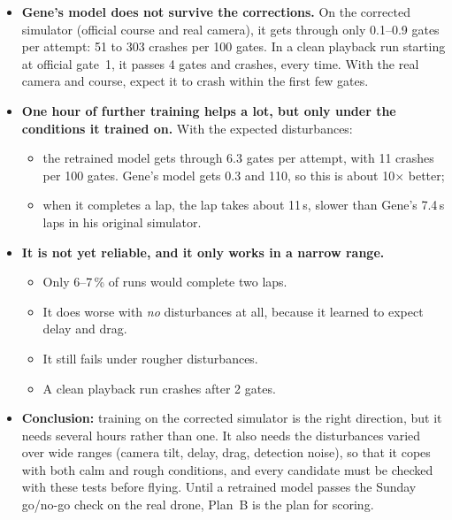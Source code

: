 \begin{verdict}
\begin{itemize}
\item \textbf{Gene's model does not survive the corrections.} On the corrected simulator (official course and real camera), it gets through only 0.1--0.9 gates per attempt: 51 to 303 crashes per 100 gates. In a clean playback run starting at official gate~1, it passes 4 gates and crashes, every time. With the real camera and course, expect it to crash within the first few gates.
\item \textbf{One hour of further training helps a lot, but only under the conditions it trained on.} With the expected disturbances:
\begin{itemize}
\item the retrained model gets through 6.3 gates per attempt, with 11 crashes per 100 gates. Gene's model gets 0.3 and 110, so this is about 10$\times$ better;
\item when it completes a lap, the lap takes about 11\,s, slower than Gene's 7.4\,s laps in his original simulator.
\end{itemize}
\item \textbf{It is not yet reliable, and it only works in a narrow range.}
\begin{itemize}
\item Only 6--7\,\% of runs would complete two laps.
\item It does worse with \emph{no} disturbances at all, because it learned to expect delay and drag.
\item It still fails under rougher disturbances.
\item A clean playback run crashes after 2 gates.
\end{itemize}
\item \textbf{Conclusion:} training on the corrected simulator is the right direction, but it needs several hours rather than one. It also needs the disturbances varied over wide ranges (camera tilt, delay, drag, detection noise), so that it copes with both calm and rough conditions, and every candidate must be checked with these tests before flying. Until a retrained model passes the Sunday go/no-go check on the real drone, Plan~B is the plan for scoring.
\end{itemize}
\end{verdict}
